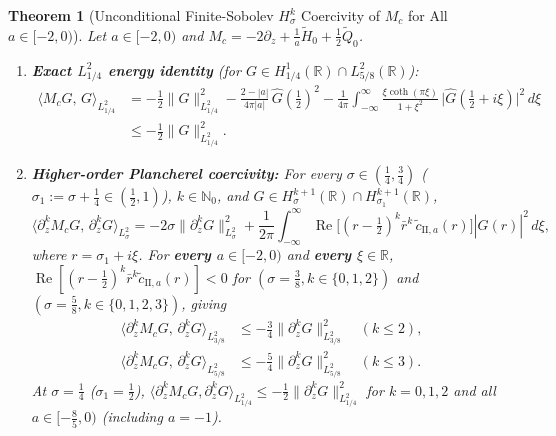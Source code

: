 \documentclass[11pt,a4paper]{article}
\newtheorem{thm}{Theorem}
\begin{document}
\begin{thm}[Unconditional Finite-Sobolev $H^k_\sigma$ Coercivity of $M_c$ for All $a \in [-2,0)$]\label{thm:sobolev_coerc}
Let $a \in [-2, 0)$ and $M_c = -2\partial_z + \frac{1}{a}\widetilde{H}_0 + \frac{1}{2}\widetilde{Q}_0$.
\begin{enumerate}
  \item \textbf{Exact $L^2_{1/4}$ energy identity} (for $G \in H^1_{1/4}(\mathbb{R}) \cap L^2_{5/8}(\mathbb{R})$):
  \begin{equation}\label{eq:L2_quarter_id}
  \begin{aligned}
  \langle M_c G,\, G\rangle_{L^2_{1/4}}
  &= -\frac{1}{2}\|G\|_{L^2_{1/4}}^2 - \frac{2-|a|}{4\pi|a|}\,\widehat{G}\!\left(\tfrac{1}{2}\right)^2
     - \frac{1}{4\pi}\int_{-\infty}^\infty \frac{\xi\coth(\pi\xi)}{1+\xi^2}\,\big|\widehat{G}(\tfrac{1}{2}+i\xi)\big|^2\,d\xi \\
  &\le -\frac{1}{2}\|G\|_{L^2_{1/4}}^2.
  \end{aligned}
  \end{equation}
  \item \textbf{Higher-order Plancherel coercivity:} For every $\sigma \in (\frac{1}{4}, \frac{3}{4})$ ($\sigma_1 := \sigma + \frac{1}{4} \in (\frac{1}{2}, 1)$), $k \in \mathbb{N}_0$, and $G \in H^{k+1}_\sigma(\mathbb{R}) \cap H^{k+1}_{\sigma_1}(\mathbb{R})$,
  \[
  \langle \partial_z^k M_c G,\, \partial_z^k G\rangle_{L^2_\sigma} = -2\sigma\|\partial_z^k G\|_{L^2_\sigma}^2 + \frac{1}{2\pi}\int_{-\infty}^\infty \operatorname{Re}\!\Big[(r-\tfrac{1}{2})^k\bar r^k\,\tilde c_{\mathrm{II},a}(r)\Big]|\widehat{G}(r)|^2\,d\xi,
  \]
  where $r = \sigma_1 + i\xi$. For \textbf{every $a \in [-2,0)$} and \textbf{every $\xi \in \mathbb{R}$}, $\operatorname{Re}[(r-\frac{1}{2})^k\bar r^k\tilde c_{\mathrm{II},a}(r)] < 0$ for $(\sigma = \frac{3}{8}, k \in \{0,1,2\})$ and $(\sigma = \frac{5}{8}, k \in \{0,1,2,3\})$, giving
  \begin{align*}
  \langle \partial_z^k M_c G,\, \partial_z^k G\rangle_{L^2_{3/8}} &\le -\frac{3}{4}\|\partial_z^k G\|_{L^2_{3/8}}^2 \quad (k\le 2), \\
  \langle \partial_z^k M_c G,\, \partial_z^k G\rangle_{L^2_{5/8}} &\le -\frac{5}{4}\|\partial_z^k G\|_{L^2_{5/8}}^2 \quad (k\le 3).
  \end{align*}
  At $\sigma = \frac{1}{4}$ ($\sigma_1 = \frac{1}{2}$), $\langle \partial_z^k M_c G, \partial_z^k G\rangle_{L^2_{1/4}} \le -\frac{1}{2}\|\partial_z^k G\|_{L^2_{1/4}}^2$ for $k = 0,1,2$ and all $a \in [-\frac{8}{5}, 0)$ (including $a = -1$).
\end{enumerate}
\end{thm}
\end{document}
